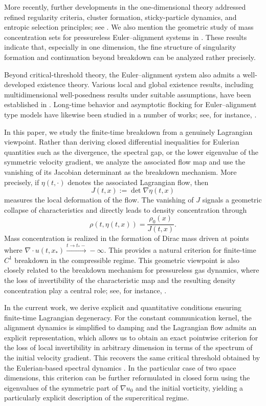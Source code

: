 \documentclass[11pt]{amsart}
\numberwithin{equation}{section}
\theoremstyle{definition}
\theoremstyle{remark}
\numberwithin{equation}{section}
\begin{document}
More recently, further developments in the one-dimensional theory addressed refined regularity criteria, cluster formation, sticky-particle dynamics, and entropic selection principles; see \cite{CCTpre, LT23, LT24}. We also mention the geometric study of mass concentration sets for pressureless Euler--alignment systems in \cite{LLST22}. These results indicate that, especially in one dimension, the fine structure of singularity formation and continuation beyond breakdown can be analyzed rather precisely.

Beyond critical-threshold theory, the Euler--alignment system also admits a well-developed existence theory. Various local and global existence results, including multidimensional well-posedness results under suitable assumptions, have been established in \cite{Cho19,CJ24,HKK14, HT17}. Long-time behavior and asymptotic flocking for Euler--alignment type models have likewise been studied in a number of works; see, for instance, \cite{CCKTpre,ST20,ST21,Tad23}.  

In this paper, we study the finite-time breakdown from a genuinely Lagrangian viewpoint. Rather than deriving closed differential inequalities for Eulerian quantities such as the divergence, the spectral gap, or the lower eigenvalue of the symmetric velocity gradient, we analyze the associated flow map and use the vanishing of its Jacobian determinant as the breakdown mechanism. More precisely, if $\eta(t,\cdot)$ denotes the associated Lagrangian flow, then
\[
J(t,x):=\det \nabla \eta(t,x)
\]
measures the local deformation of the flow. The vanishing of $J$ signals a geometric collapse of characteristics and directly leads to density concentration through
\[
\rho(t,\eta(t,x))=\frac{\rho_0(x)}{J(t,x)}.
\]
Mass concentration  is realized in the formation of Dirac mass  driven at points where  $\nabla\cdot u(t,x_*)\stackrel{t\rightarrow t_*-}{\longrightarrow} -\infty$. This provides a natural criterion for finite-time $C^1$ breakdown in the compressible regime. This geometric viewpoint is also closely related to the breakdown mechanism for pressureless gas dynamics, where the loss of invertibility of the characteristic map and the resulting density concentration play a central role; see, for instance, \cite{BCH25_2, BCH25, GS97, Pou99}.

In the current work, we derive explicit and quantitative conditions ensuring finite-time Lagrangian degeneracy. For the constant communication kernel, the alignment dynamics is simplified to damping and the Lagrangian flow admits an explicit representation, which allows us to obtain an exact pointwise criterion for the loss of local invertibility in arbitrary dimension in terms of the spectrum of the initial velocity gradient. This recovers the same critical threshold obtained by the Eulerian-based spectral dynamics \cite[\S4]{LT02}.
In the particular case of two space dimensions, this criterion can be further reformulated in closed form using the eigenvalues of the symmetric part of $\nabla u_0$ and the initial vorticity, yielding a particularly explicit description of the supercritical regime. 
\end{document}

